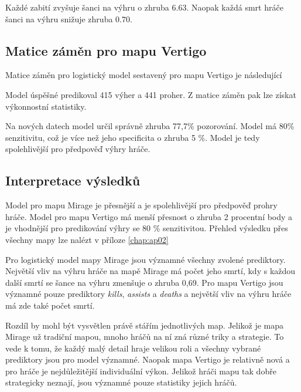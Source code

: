 Každé zabití zvyšuje šanci na výhru o zhruba $6.63$. Naopak každá smrt hráče šanci na výhru snižuje zhruba $0.70$.

\newpage
\subsection{Matice záměn pro mapu Vertigo}
Matice záměn pro logistický model sestavený pro mapu Vertigo je následující



Model úspěšné predikoval 415 výher a 441 proher. Z matice záměn pak lze získat výkonnostní statistiky.



Na nových datech model určil správně zhruba 77,7\% pozorování. Model má 80\% senzitivitu, což je více než jeho specificita o zhruba 5 \%. Model je tedy spolehlivější
pro předpověď výhry hráče.

\subsection{Interpretace výsledků}
Model pro mapu Mirage je přesnější a je spolehlivější pro předpověď prohry hráče. Model pro mapu Vertigo má menší přesnost o zhruba 
2 procentní body a je vhodnější pro predikování výhry se 80 \% senzitivitou.
{\color{red}
Přehled výsledku přes všechny mapy lze nalézt v příloze \ref{chap:ap02}
}

Pro logistický model mapy Mirage jsou významné všechny zvolené prediktory. Největší vliv na výhru hráče na mapě Mirage má počet jeho smrtí, kdy s každou další smrtí se šance
na výhru zmenšuje o zhruba 0,69. Pro mapu Vertigo jsou významné pouze prediktory \textit{kills}, \textit{assists} a \textit{deaths} a největší vliv na výhru hráče
má zde také počet smrtí.

Rozdíl by mohl být vysvětlen právě stářím jednotlivých map. Jelikož je mapa Mirage už tradiční mapou, mnoho hráčů na ní zná různé triky a strategie. To vede k tomu, že
každý malý detail hraje velikou roli a všechny vybrané prediktory jsou pro model významné. Naopak mapa Vertigo je relativně nová a pro hráče je nejdůležitější individuální
výkon. Jelikož hráči mapu tak dobře strategicky neznají, jsou významné pouze statistiky jejich hráčů.